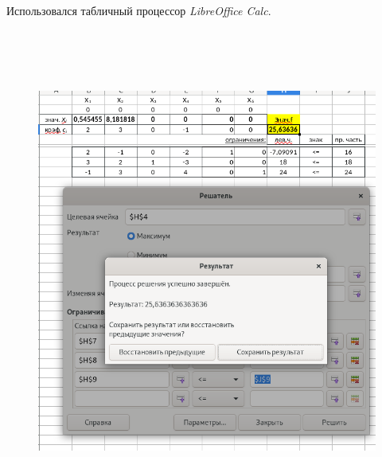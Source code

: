 \documentclass[a4paper,12pt]{article}
\begin{document}
\begin{flushleft}
\begin{enumerate}
    Использовался табличный процессор \textit{LibreOffice Calc}.
    \begin{figure}[h]
      \includegraphics[width=15cm,height=16cm]{calc.png}      
    \end{figure}
\end{enumerate}
\end{flushleft}
\end{document}

